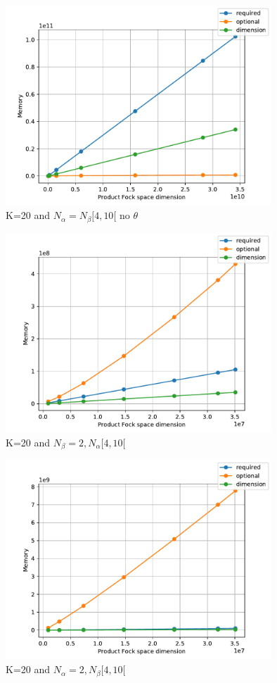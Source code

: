 \documentclass[12p]{article}
\begin{document}
\begin{center}
\begin{figure}
  \centering
  \includegraphics[width=10cm]{graphs/K=20_low.pdf}
  \caption{K=20 and $N_\alpha = N_\beta [4,10[$  no $\theta$}
  \label{}
\end{figure}

\begin{figure}
  \centering
  \includegraphics[width=10cm]{graphs/K=20_neq.pdf}
  \caption{K=20 and $N_\beta = 2, N_\alpha [4,10[$}
  \label{}
\end{figure}

\begin{figure}
  \centering
  \includegraphics[width=10cm]{graphs/K=20_neq_dumb.pdf}
  \caption{K=20 and $N_\alpha = 2, N_\beta [4,10[$}
  \label{}
\end{figure}


\end{center}
\end{document}
